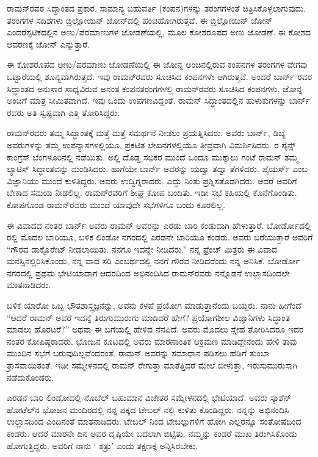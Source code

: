 ರಾಮನ್‍ರವರ ಸಿದ್ಧಾಂತದ ಪ್ರಕಾರ, ಸಾಮಾನ್ಯ ಬಹುವರ್ತಿ (ಕಂಪನ)ಗಳನ್ನು ತರಂಗಗಳಂತೆ ಚಿತ್ರಿಸಿಕೊಳ್ಳಲಾಗುವುದು. ತರಂಗಗಳ ಸದಿಶಗಳು ಬ್ರಿಲ್ಲೋಯಿನ್ ಜೋನ್‍ದಲ್ಲಿ ಹಂಚಿಹೋಗಿರುತ್ತವೆ. ಈ ಬ್ರಿಲ್ಲೋಯಿನ್ ಜೋನ್ ಎಂದರೆ\enginline{-}ಸ್ಫಟಿಕದಲ್ಲಿನ ಅಣು/ಪರಮಾಣುಗಳ ಜೋಡಣೆಯಲ್ಲಿ, ಮೂಲ ಕೋಶರೂಪದ ಅಣು ಜೋಡಣೆ. ಈ ಕೋಶದ ಆವರಣಕ್ಕೆ ಜೋನ್ ಎನ್ನುತ್ತಾರೆ.

ಈ ಕೋಶರೂಪದ ಅಣು/ಪರಮಾಣು ಜೋಡಣೆಯಲ್ಲಿ ಈ ಜೋನ್ನ ಅಂಚಿನಲ್ಲಿರುವ ಕಂಪನಗಳ ತರಂಗಗಳ ವೇಗವು ಒಟ್ಟಾರೆಯಲ್ಲಿ ಶೂನ್ಯವಾಗಿರುತ್ತದೆ. ಇವು ರಾಮನ್‍ರವರು ಸೂಚಿಸಿದ ಕಂಪನಗಳೇ ಆಗಿರುತ್ತವೆ. ಅಂದರೆ ಬಾರ್ನ್ ರವರ ಸಿದ್ಧಾಂತದ ಅನುಸಾರ ಸಾಧ್ಯವಿರುವ ಅನಂತ ಕಂಪನ\enginline{-}ತರಂಗಗಳಲ್ಲಿ ರಾಮನ್‍ರವರು ಸೂಚಿಸಿದ ಕಂಪನಗಳು, ಜೋನ್ನ ಅಂಚಿಗೆ ಮಾತ್ರ ಸೀಮಿತವಾಗಿದೆ. ಇವು ಒಂದು ಉಪಗಣವಿದ್ದಂತೆ. ರಾಮನ್ ಸಿದ್ಧಾಂತದಲ್ಲಿನ ಹುಳುಕುಗಳನ್ನು ಬಾರ್ನ್ ರವರು ಅತಿ ಸ್ವಷ್ಟವಾಗಿ ಎತ್ತಿ ತೋರಿಸಿದ್ದರು.

ರಾಮನ್‍ರವರು ತಮ್ಮ ಸಿದ್ಧಾಂತಕ್ಕೆ ಮತ್ತೆ ಮತ್ತೆ ಸಮರ್ಥನೆ ನೀಡಲು ಪ್ರಯತ್ನಿಸಿದರು. ಅವರು ಬಾರ್ನ್, ಡಿಬ್ಯೆ ಅವರುಗಳನ್ನು ತಮ್ಮ ಉಪನ್ಯಾಸಗಳಲ್ಲಿಯೂ, ಪ್ರಕಟಿತ ಲೇಖನಗಳಲ್ಲಿಯೂ ತೀವ್ರವಾಗಿ ವಿಮರ್ಶಿಸಿದರು. ರ ಸೈನ್ಸ್ ಕಾಂಗ್ರೆಸ್ ಬೆಂಗಳೂರಿನಲ್ಲಿ ನಡೆಯಿತು. ಅಲ್ಲಿ ದೊಡ್ಡ ಸಭಿಕರ ಮುಂದೆ ಒಂದೂ ಮುಕ್ಕಾಲು ಗಂಟೆ ರಾಮನ್ ತಮ್ಮ ಲ್ಯಾಟಿಸ್ ಸಿದ್ಧಾಂತವನ್ನು ಮಂಡಿಸಿದರು. ಹಾಗೆಯೇ ಬಾರ್ನ್ ಅವರನ್ನು ಯದ್ವಾ ತದ್ವಾ ತೆಗಳಿದರು. ಪೈಯರ್ಸ್ ಎಂಬ ವಿಜ್ಞಾನಿಯು ಮುಂದೆ ಕುಳಿತಿದ್ದರು. ಅವರು ಉದ್ವಿಗ್ನರಾದರು. ಎದ್ದು ನಿಂತು ಪ್ರಶ್ನಿಸತೊಡಗಿದರು. ಆದರೆ ಅವರಿಗೆ ಬೇಕಾದ ಸಮಯ ನೀಡಲಿಲ್ಲ. ರಾಮನ್‍ರವರಿಗೆ ಶೀಘ್ರ ಕೋಪ ಬಂದಿತು. ಇಡೀ ಸಭೆ ಕಹಿಯಲ್ಲಿ ಕೊನೆಗೊಂಡಿತು. ಕೋಪಗೊಂಡ ರಾಮನ್‍ರವರು ಮುಂದೆ ಯಾವುದೇ ಸಭೆಗಳಿಗೂ ಬಂದು ಕೂರಲಿಲ್ಲ.

ಈ ವಿವಾದದ ನಂತರ ಬಾರ್ನ್ ಅವರು ರಾಮನ್ ಅವರನ್ನು ಎರಡು ಬಾರಿ ಕಂಡುದಾಗಿ ಹೇಳುತ್ತಾರೆ. ಬೋರ್ಡೋದಲ್ಲಿ ರಲ್ಲಿ ಮೊದಲ ಬಾರಿಯೂ, ಬಳಿಕ ಲಿಂಡೋ ನಗರದಲ್ಲಿ ಎರಡನೇ ಬಾರಿಯೂ ಕಂಡರು. ಅವರು ಬರೆಯುತ್ತಾರೆ\enginline{-} ಅವರಿಗೆ “ಗೌರವ ಡಾಕ್ಟೊರೇಟ್ ನೀಡಲಾಯಿತು. ನನಗೂ ಇದನ್ನೇ ನೀಡಿದರು.” ನನ್ನ ಫ್ರೆಂಚ್ ಮಿತ್ರರು ಈ ವಿವಾದ ಮನಸ್ಸಿನಲ್ಲಿರಿಸಿಕೊಂಡು, ನನ್ನ ವಾದ ಸರಿ ಎಂಬರ್ಥದಲ್ಲಿ ನನಗೆ ಗೌರವ ನೀಡಿದರೆಂದು ನನ್ನ ಅನಿಸಿಕೆ. ಬೋರ್ಡೋ ನಗರದಲ್ಲಿ ಪ್ರಥಮ ಭೇಟಿಯಾದಾಗ ಆದರದಿಂದ ಅಭಿನಂದಿಸಿದ ರಾಮನ್‍ರವರು ನನ್ನೊಡನೆ ಉಲ್ಲಾಸದಿಂದಲೇ ಮಾತನಾಡಿದರು.

ಬಳಿಕ ಯಾರೋ ಒಬ್ಬ ಭೌತಶಾಸ್ತ್ರಜ್ಞನನ್ನು, ಅವನು ಕಳಪೆ ಪ್ರಯೋಗ ಮಾಡುತ್ತಾನೆಂದು ಬಯ್ದರು. ನಾನು ಹೀಗೆಂದೆ \enginline{-} “ಆದರೆ ರಾಮನ್ ಅವರೆ ಇದನ್ನೆ ತಿರುಗುಮುರುಗು ಮಾಡಿದರೆ ಹೇಗೆ? ಪ್ರಯೋಗಶೀಲ ವಿಜ್ಞಾನಿಗಳು ಸಿದ್ಧಾಂತ ಮಾಡಲು ಹೊರಟರೆ?” ಅಥವಾ ಈ ಬಗೆಯಲ್ಲಿ ಹೇಳಿದ ನೆನಪಿದೆ. ಅವರು ಮೊದಲು ಸ್ನೇಹ ತೋರಿಸಿದರೂ ಇದರ ನಂತರ ಕೋಪಿಷ್ಠರಾದರು. ಭೋಜನ ಕೂಟದಲ್ಲಿ ಅವರು ಮಾರಣಾಂತಿಕ ಆಕ್ರಮಣ ಮಾಡಿದ್ದೇನೆಂದು ಹೇಳಿ ತಾವು ಮುಂದಿನ ಸಭೆಗೆ ಬರುವುದಿಲ್ಲವೆಂದರಂತೆ. ರಾಮನ್ ಅವರನ್ನು ಸಮಾಧಾನ ಪಡಿಸಲು ಹೆಡಿಗೆ ತುಂಬಾ ತ್ರಾಸವಾಯಿತಂತೆ. ಇಡೀ ಸಮ್ಮೇಳನದಲ್ಲಿ ರಾಮನ್ ರೇಗುತ್ತಾ ಮಾತೆತ್ತಿದರೆ ಮೇಲೆ ಬೀಳುತ್ತಾ, ಇರುಸುಮುರುಸಾಗಿ ನಡೆದುಕೊಂಡರು.

ಎರಡನೆ ಬಾರಿ ಲಿಂಡೋದಲ್ಲಿ ನೊಬೆಲ್ ಬಹುಮಾನ ವಿಜೇತರ ಸಮ್ಮೇಳನದಲ್ಲಿ ಭೇಟಿಯಾದೆ. ಅವರು ಸ್ಕಾಶೆನ್ ಹೋಟೆಲ್‍ನ ಭೋಜನ ಮಂದಿರದಲ್ಲಿ ನನ್ನ ಪಕ್ಕದ ಟೇಬಲ್ ನಲ್ಲಿ ಕುಳಿತು ಕೊಂಡಿದ್ದರು. ನನ್ನನ್ನು ಅಭಿನಂದಿಸಿ ಉಲ್ಲಾಸದಿಂದ ಎಂದಿನಂತೆ ಮಾತನಾಡಿದರು. ಟೇಬಲ್ ನಿಂದ ಟೇಬಲ್ಲುಗಳಿಗೆ ಹೋಗಿ ಎಲ್ಲರನ್ನೂ ಸಂತೋಷದಿಂದ ಕಂಡರು. ಆದರೆ ಮಾರನೇ ದಿನ ಅವರ ದೃಷ್ಠಿಯೇ ಬದಲಾಗಿ ಬಿಟ್ಟಿತು. ನಮ್ಮನ್ನು ಕಂಡರೆ ಮುಖ ತಿರುಗಿಸಿಕೊಂಡು ಹೋಗುತ್ತಿದ್ದರು. ಅವರಿಗೆ ನಾನು ‘ ಶತ್ರು’ ಎಂದು ತಕ್ಷಣಕ್ಕೆ ಅನ್ನಿಸಿರಬೇಕು.

